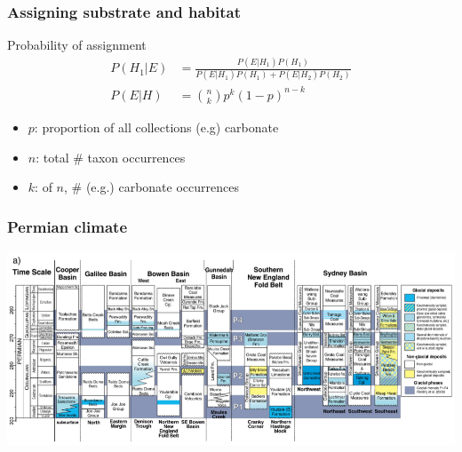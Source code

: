 \documentclass{beamer}
\begin{document}
\begin{frame}
  \frametitle{Assigning substrate and habitat}

  \begin{block}{Probability of assignment}
    \begin{align*}
      P(H_{1}|E) &= \frac{P(E|H_{1})P(H_{1})}{P(E|H_{1})P(H_{1}) + P(E|H_{2})P(H_{2})} \\
      P(E|H) &= \binom{n}{k} p^{k}(1 - p)^{n - k}
    \end{align*}

    \begin{itemize}
      \item \(p\): proportion of all collections (e.g) carbonate
      \item \(n\): total \# taxon occurrences
      \item \(k\): of \(n\), \# (e.g.) carbonate occurrences
    \end{itemize}

    \tiny{}
  \end{block}
\end{frame}

\begin{frame}
  \frametitle{Permian climate}
  \begin{center}
    \includegraphics[height = 0.8\textheight, width = \textwidth, keepaspectratio = true]{figure/glacial}

    \tiny{}
  \end{center}
\end{frame}
\end{document}
